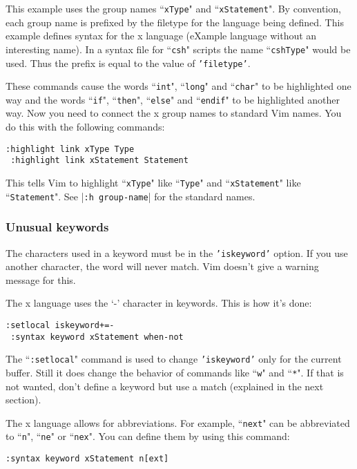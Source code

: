 This example uses the group names ``\texttt{xType}" and ``\texttt{xStatement}".
By convention, each group name is prefixed by the filetype for the language being defined.
This example defines syntax for the x language (eXample language without an interesting name).
In a syntax file for ``\texttt{csh}" scripts the name ``\texttt{cshType}" would be used.
Thus the prefix is equal to the value of \texttt{'filetype'}.

These commands cause the words ``\texttt{int}", ``\texttt{long}" and ``\texttt{char}" to be highlighted one way and the words ``\texttt{if}", ``\texttt{then}", ``\texttt{else}" and ``\texttt{endif}" to be highlighted another way.
Now you need to connect the x group names to standard Vim names.
You do this with the following commands:

\begin{Verbatim}[samepage=true]
 :highlight link xType Type
 :highlight link xStatement Statement
\end{Verbatim}

This tells Vim to highlight ``\texttt{xType}" like ``\texttt{Type}" and ``\texttt{xStatement}" like ``\texttt{Statement}".
See |\texttt{:h group-name}| for the standard names.

\subsubsection{Unusual keywords}
The characters used in a keyword must be in the \texttt{'iskeyword'} option.
If you use another character, the word will never match.
Vim doesn't give a warning message for this.

The x language uses the `-' character in keywords.
This is how it's done:

\begin{Verbatim}[samepage=true]
 :setlocal iskeyword+=-
 :syntax keyword xStatement when-not
\end{Verbatim}

The ``\texttt{:setlocal}" command is used to change \texttt{'iskeyword'} only for the current buffer.
Still it does change the behavior of commands like ``\texttt{w}" and ``\texttt{*}".
If that is not wanted, don't define a keyword but use a match (explained in the next section).

The x language allows for abbreviations.
For example, ``\texttt{next}" can be abbreviated to ``\texttt{n}", ``\texttt{ne}" or ``\texttt{nex}".
You can define them by using this command:

\begin{Verbatim}[samepage=true]
 :syntax keyword xStatement n[ext]
\end{Verbatim}

